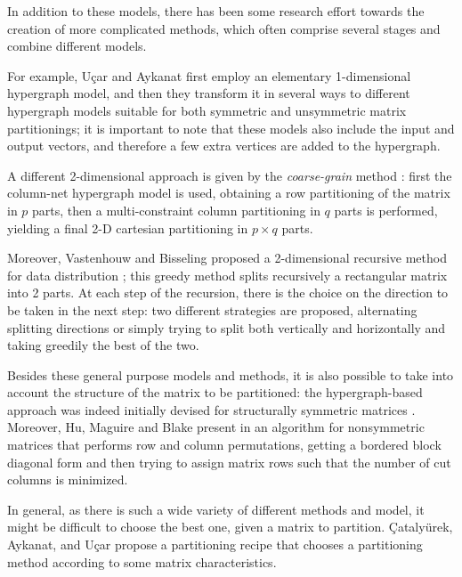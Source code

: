 In addition to these models, there has been some research effort towards the creation of more complicated methods, which often comprise several stages and combine different models.

For example, Uçar and Aykanat \cite{hypergraph_revisiting} first employ an elementary 1-dimensional hypergraph model, and then they transform it in several ways to different hypergraph models suitable for both symmetric and unsymmetric matrix partitionings; it is important to note that these models also include the input and output vectors, and therefore a few extra vertices are added to the hypergraph.

A different 2-dimensional approach is given by the \emph{coarse-grain} method \cite{hypergraph_coarsegrain}: first the column-net hypergraph model is used, obtaining a row partitioning of the matrix in $p$ parts, then a multi-constraint column partitioning in $q$ parts is performed, yielding a final 2-D cartesian partitioning in $p \times q$ parts. 

Moreover, Vastenhouw and Bisseling proposed a 2-dimensional recursive method for data distribution \cite{mondriaan}; this greedy method splits recursively a rectangular matrix into 2 parts.
At each step of the recursion, there is the choice on the direction to be taken in the next step: two different strategies are proposed, alternating splitting directions or simply trying to split both vertically and horizontally and taking greedily the best of the two.

Besides these general purpose models and methods, it is also possible to take into account the structure of the matrix to be partitioned: the hypergraph-based approach was indeed initially devised for structurally symmetric matrices \cite{hypergraph_model}. Moreover, Hu, Maguire and Blake present in \cite{hu2000} an algorithm for nonsymmetric matrices that performs row and column permutations, getting a bordered block diagonal form and then trying to assign matrix rows such that the number of cut columns is minimized.

In general, as there is such a wide variety of different methods and model, it might be difficult to choose the best one, given a matrix to partition. {\c{C}}ataly{\"u}rek, Aykanat, and U{\c{c}}ar propose a partitioning recipe \cite{catalyurek_recipe} that chooses a partitioning method according to some matrix characteristics.

